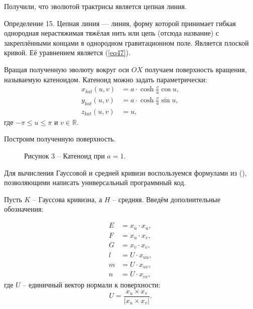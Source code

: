 \documentclass[14pt,a4paper]{extarticle}
\begin{document}
Получили, что эволютой трактрисы является цепная линия.

Определение 15. Цепная линия — линия, форму которой принимает гибкая однородная нерастяжимая тяжёлая нить или цепь (отсюда название) с закреплёнными концами в однородном гравитационном поле. Является плоской кривой. Её уравнением является (\ref{eq47}).



Вращая полученную эволюту вокруг оси $OX$ получаем поверхность вращения, называемую катеноидом. Катеноид можно задать параметрически:
\begin{align}
	x_{kat}(u,v) &= a\cdot \cosh{\frac{v}{a}}\cos{u},\label{eq48}\\
	y_{kat}(u,v) &= a\cdot \cosh{\frac{v}{a}}\sin{u},\label{eq49}\\
	z_{kat}(u,v) &= u,\label{eq50}
\end{align}
где $-\pi \leq u \leq \pi$ и $v \in \mathbb{R}$.


Построим полученную поверхность.
\begin{figure}[h]
	\caption*{Рисунок 3 -- Катеноид при $a=1$.}
	\label{ris:plot3}
\end{figure}


Для вычисления Гауссовой и средней кривизн воспользуемся формулами из (\cite{Oprea}), позволяющими написать универсальный программный код.


Пусть $K$ -- Гауссова кривизна, а $H$ -- средняя. Введём дополнительные обозначения:

\begin{align}
	E &= x_u \cdot x_u, \label{eq51}\\
	F &= x_u \cdot x_v, \label{eq52}\\
	G &= x_v \cdot x_v, \label{eq53}\\
	l &= U \cdot x_{uu}, \label{eq54}\\
	m &= U \cdot x_{uv}, \label{eq55}\\
	n &= U \cdot x_{vv}, \label{eq56}
\end{align}
где $U$ -- единичный вектор нормали к поверхности:
\begin{equation}
	U = \frac{x_u \times x_v}{|x_u \times x_v|}.\label{eq 57}
\end{equation}
\end{document}
